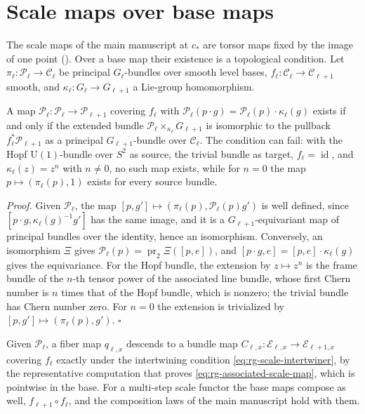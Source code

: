 \section{Scale maps over base maps}
\label{sec:rg-scale-maps-base}

The scale maps of the main manuscript at \(c_*\) are torsor maps fixed by the image of one point
(). Over a base map their existence is a topological condition. Let
\(\pi_\ell:\mathscr P_\ell\to\mathcal C_\ell\) be principal \(G_\ell\)-bundles over smooth level bases,
\(f_\ell:\mathcal C_\ell\to\mathcal C_{\ell+1}\) smooth, and \(\kappa_\ell:G_\ell\to G_{\ell+1}\) a
Lie-group homomorphism.

A map \(\mathcal P_\ell:\mathscr P_\ell\to\mathscr P_{\ell+1}\) covering \(f_\ell\) with
\(\mathcal P_\ell(p\cdot g)=\mathcal P_\ell(p)\cdot\kappa_\ell(g)\) exists if and only if the extended
bundle \(\mathscr P_\ell\times_{\kappa_\ell}G_{\ell+1}\) is isomorphic to the pullback
\(f_\ell^*\mathscr P_{\ell+1}\) as a principal \(G_{\ell+1}\)-bundle over \(\mathcal C_\ell\). The
condition can fail: with the Hopf \(\mathrm U(1)\)-bundle over \(S^2\) as source, the trivial
bundle as target, \(f_\ell=\operatorname{id}\), and \(\kappa_\ell(z)=z^n\) with \(n\neq0\), no such
map exists, while for \(n=0\) the map \(p\mapsto(\pi_\ell(p),1)\) exists for every source bundle.

\noindent\emph{Proof.}
Given \(\mathcal P_\ell\), the map \([p,g']\mapsto(\pi_\ell(p),\mathcal P_\ell(p)g')\) is well defined,
since \([p\cdot g,\kappa_\ell(g)^{-1}g']\) has the same image, and it is a
\(G_{\ell+1}\)-equivariant map of principal bundles over the identity, hence an isomorphism.
Conversely, an isomorphism \(\Xi\) gives \(\mathcal P_\ell(p)=\operatorname{pr}_2\Xi([p,e])\), and
\([p\cdot g,e]=[p,e]\cdot\kappa_\ell(g)\) gives the equivariance. For the Hopf bundle, the extension
by \(z\mapsto z^n\) is the frame bundle of the \(n\)-th tensor power of the associated line bundle,
whose first Chern number is \(n\) times that of the Hopf bundle, which is nonzero; the trivial bundle
has Chern number zero. For \(n=0\) the extension is trivialized by \([p,g']\mapsto(\pi_\ell(p),g')\).
\hfill$\square$

Given \(\mathcal P_\ell\), a fiber map \(q_{\ell,x}\) descends to a bundle map
\(C_{\ell,x}:\mathcal E_{\ell,x}\to\mathcal E_{\ell+1,x}\) covering \(f_\ell\) exactly under the
intertwining condition \eqref{eq:rg-scale-intertwiner}, by the representative computation that
proves \eqref{eq:rg-associated-scale-map}, which is pointwise in the base. For a multi-step scale
functor the base maps compose as well, \(f_{\ell+1}\circ f_\ell\), and the composition laws of the main
manuscript hold with them.

